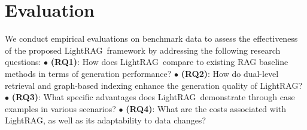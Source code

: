 \documentclass{article} %
\def\model{LightRAG}
\begin{document}





% 

\section{Evaluation}
\label{sec:eval}
We conduct empirical evaluations on benchmark data to assess the effectiveness of the proposed \model\ framework by addressing the following research questions: $\bullet$ \textbf{(RQ1)}: How does \model\ compare to existing RAG baseline methods in terms of generation performance? $\bullet$ \textbf{(RQ2)}: How do dual-level retrieval and graph-based indexing enhance the generation quality of \model? $\bullet$ \textbf{(RQ3)}: What specific advantages does \model\ demonstrate through case examples in various scenarios? $\bullet$ \textbf{(RQ4)}: What are the costs associated with \model, as well as its adaptability to data changes?
\end{document}
